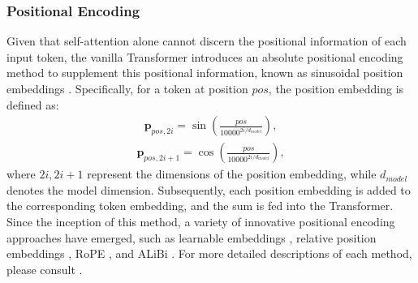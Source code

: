 \subsubsection{Positional Encoding}
Given that self-attention alone cannot discern the positional information of each input token, the vanilla Transformer introduces an absolute positional encoding method to supplement this positional information, known as sinusoidal position embeddings \cite{vaswani2017attention}. 
Specifically, for a token at position $pos$, the position embedding is defined as:
\begin{equation}\label{eq:sin}
\begin{aligned}
    \mathbf{p}_{pos,2i}=\sin(\frac{pos}{10000^{2i/d_{model}}}),
\end{aligned}
\end{equation}
\begin{equation}\label{eq:cos}
\begin{aligned}
    \mathbf{p}_{pos,2i+1}=\cos(\frac{pos}{10000^{2i/d_{model}}}), 
\end{aligned}
\end{equation}
where $2i, 2i+1$ represent the dimensions of the position embedding, while $d_{model}$ denotes the model dimension. Subsequently, each position embedding is added to the corresponding token embedding, and the sum is fed into the Transformer. 
Since the inception of this method, a variety of innovative positional encoding approaches have emerged, such as learnable embeddings \cite{devlin2018bert}, relative position embeddings \cite{shaw2018self}, RoPE \cite{su2024roformer}, and ALiBi \cite{press2021train}. 
For more detailed descriptions of each method, please consult \cite{lin2022survey,zhao2023length}.

\subsubsection{}



